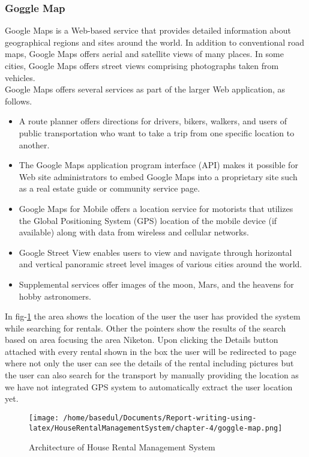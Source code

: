 \documentclass[12pt,a4paper]{article}
\newcommand\tab[1][.7cm]{\hspace*{#1}}
\begin{document}
	\subsubsection{Goggle Map}
		\tab Google Maps\cite{Ref:19} is a Web-based service that provides detailed information about geographical regions and sites around the world. In addition to conventional road maps, Google Maps offers aerial and satellite views of many places. In some cities, Google Maps offers street views comprising photographs taken from vehicles.\\Google Maps offers several services as part of the larger Web application, as follows.
		\begin{itemize}
			\item A route planner offers directions for drivers, bikers, walkers, and users of public transportation who want to take a trip from one specific location to another.
			\item The Google Maps application program interface (API) makes it possible for Web site administrators to embed Google Maps into a proprietary site such as a real estate guide or community service page.
			\item Google Maps for Mobile offers a location service for motorists that utilizes the Global Positioning System (GPS) location of the mobile device (if available) along with data from wireless and cellular networks.
			\item Google Street View enables users to view and navigate through horizontal and vertical panoramic street level images of various cities around the world.
			\item Supplemental services offer images of the moon, Mars, and the heavens for hobby astronomers.
		\end{itemize}
In fig-\ref{fig:map} the area shows the location of the user the user has provided the system while searching for rentals. Other the pointers show the results of the search based on area focusing the area Niketon.
Upon clicking the Details button attached with every rental shown in the box the user will be redirected
to page where not only the user can see the details of the rental including pictures but the user can also
search for the transport by manually providing the location as we have not integrated GPS system to
automatically extract the user location yet.
	\begin{figure}[H]
		\centering
		\texttt{[image: /home/basedul/Documents/Report-writing-using-latex/HouseRentalManagementSystem/chapter-4/goggle-map.png]}
		\caption{\hspace{0.35em}Architecture of House Rental Management System}
		\label{fig:map} 
	\end{figure}
		
\end{document}

